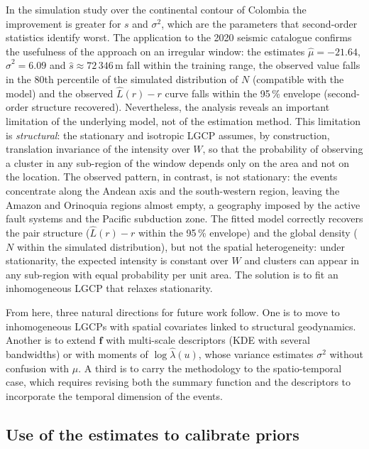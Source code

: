 \documentclass[a4paper,fleqn]{cas-sc}
\numberwithin{equation}{section}
\begin{document}
In the simulation study over the continental contour of Colombia
the improvement is greater for $s$ and $\sigma^2$, which are the
parameters that second-order statistics identify worst. The
application to the 2020 seismic catalogue confirms the usefulness of
the approach on an irregular window: the estimates
$\hat{\mu}=-21.64$, $\hat{\sigma}^2=6.09$ and
$\hat{s}\approx 72\,346$\,m fall within the training range, the
observed value falls in the 80th percentile of the simulated
distribution of $N$ (compatible with the model) and the observed
$\hat{L}(r)-r$ curve falls within the 95\,\% envelope (second-order
structure recovered). Nevertheless, the analysis reveals an
important limitation of the underlying model, not of the estimation
method. This limitation is \emph{structural}: the stationary and
isotropic LGCP assumes, by construction, translation invariance of
the intensity over $W$, so that the probability of observing a
cluster in any sub-region of the window depends only on the area
and not on the location. The observed pattern, in contrast, is not
stationary: the events concentrate along the Andean axis and the
south-western region, leaving the Amazon and Orinoquia regions
almost empty, a geography imposed by the active fault systems and
the Pacific subduction zone. The fitted model correctly recovers
the pair structure ($\hat{L}(r)-r$ within the 95\,\% envelope) and
the global density ($N$ within the simulated distribution), but not
the spatial heterogeneity: under stationarity, the expected
intensity is constant over $W$ and clusters can appear in any
sub-region with equal probability per unit area. The solution is to
fit an inhomogeneous LGCP that relaxes stationarity.

From here, three natural directions for future work follow. One is
to move to inhomogeneous LGCPs with spatial covariates linked to
structural geodynamics. Another is to extend $\mathbf{f}$ with
multi-scale descriptors (KDE with several bandwidths) or with
moments of $\log\hat{\lambda}(u)$, whose variance estimates
$\sigma^2$ without confusion with $\mu$. A third is to carry the
methodology to the spatio-temporal case, which requires revising
both the summary function and the descriptors to incorporate the
temporal dimension of the events.



\subsection{Use of the estimates to calibrate priors}
\label{sec:priors}
\end{document}
